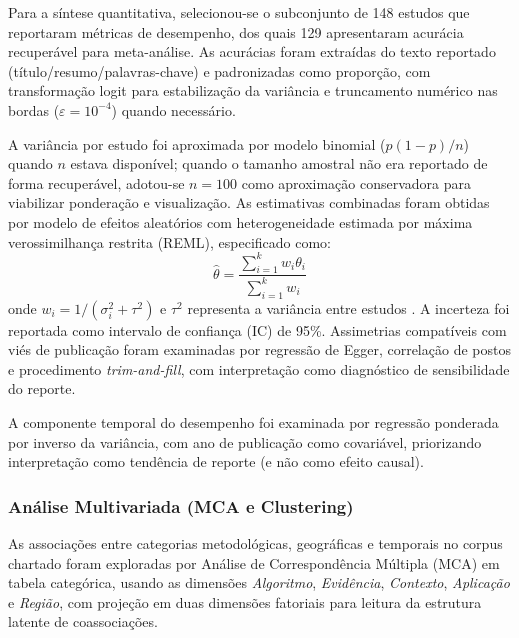 \documentclass[lineno,pdflatex,sn-apa]{sn-jnl}%
\begin{document}
Para a síntese quantitativa, selecionou-se o subconjunto de 148 estudos que reportaram métricas de desempenho, dos quais 129 apresentaram acurácia recuperável para meta-análise. As acurácias foram extraídas do texto reportado (título/resumo/palavras-chave) e padronizadas como proporção, com transformação logit para estabilização da variância e truncamento numérico nas bordas ($\varepsilon=10^{-4}$) quando necessário. 

A variância por estudo foi aproximada por modelo binomial ($p(1-p)/n$) quando $n$ estava disponível; quando o tamanho amostral não era reportado de forma recuperável, adotou-se $n=100$ como aproximação conservadora para viabilizar ponderação e visualização. As estimativas combinadas foram obtidas por modelo de efeitos aleatórios com heterogeneidade estimada por máxima verossimilhança restrita (REML), especificado como:
\begin{equation}
\hat{\theta} = \frac{\sum_{i=1}^{k} w_i \theta_i}{\sum_{i=1}^{k} w_i}
\end{equation}
onde $w_i = 1/(\sigma_i^2 + \tau^2)$ e $\tau^2$ representa a variância entre estudos \citep{Viechtbauer2010}. A incerteza foi reportada como intervalo de confiança (IC) de 95\%. Assimetrias compatíveis com viés de publicação foram examinadas por regressão de Egger, correlação de postos e procedimento \textit{trim-and-fill}, com interpretação como diagnóstico de sensibilidade do reporte.

A componente temporal do desempenho foi examinada por regressão ponderada por inverso da variância, com ano de publicação como covariável, priorizando interpretação como tendência de reporte (e não como efeito causal).

\subsubsection[Análise Multivariada]{Análise Multivariada (MCA e Clustering)}

As associações entre categorias metodológicas, geográficas e temporais no corpus chartado foram exploradas por Análise de Correspondência Múltipla (MCA) em tabela categórica, usando as dimensões \textit{Algoritmo}, \textit{Evidência}, \textit{Contexto}, \textit{Aplicação} e \textit{Região}, com projeção em duas dimensões fatoriais para leitura da estrutura latente de coassociações.
\end{document}
